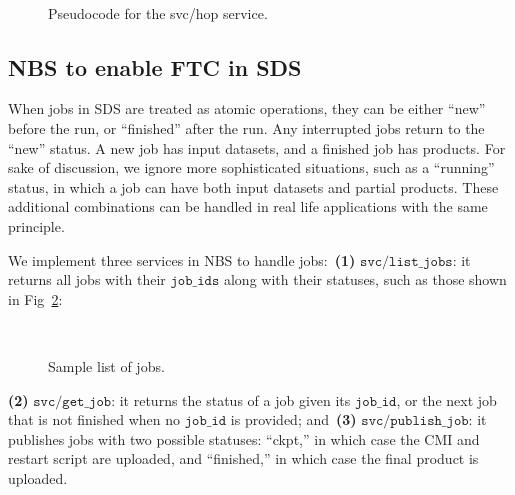 \documentclass[conference]{IEEEtran}
\begin{document}
\begin{figure}[!ht]
\vspace{0.1in}
\begin{center}
\begin{center}
\mbox{}\\[0.3em]
\end{center}
\hspace{\fill}%
\caption{Pseudocode for the svc/hop service.}
\label{code:svc_hop}
\end{center}
\end{figure}


\subsection{NBS to enable FTC in SDS}
\label{subsec:s23}

When jobs in SDS are treated as atomic operations, they can be either ``new'' before the run, or ``finished'' after the run. Any interrupted jobs return to the ``new'' status. A new job has input datasets, and a finished job has products. For sake of discussion, we ignore more sophisticated situations, such as a ``running'' status, in which a job can have both input datasets and partial products. These additional combinations can be handled in real life applications with the same principle.

We implement three services in NBS to handle jobs:~\textbf{(1)} $\mathtt{svc/list\_jobs}$: it returns all jobs with their $\mathtt{job\_ids}$ along with their statuses, such as those shown in Fig~\ref{code:jobs}:

\begin{figure}[!ht]
\vspace{0.1in}
\begin{center}
\begin{center}
\mbox{}\\[0.3em]
\end{center}
\hspace{\fill}%
\caption{Sample list of jobs.}
\label{code:jobs}
\end{center}
\end{figure}

\textbf{(2)} $\mathtt{svc/get\_job}$: it returns the status of a job given its $\mathtt{job\_id}$, or the next job that is not finished when no $\mathtt{job\_id}$ is provided; and~\textbf{(3)} $\mathtt{svc/publish\_job}$: it publishes jobs with two possible statuses: ``ckpt,'' in which case the CMI and restart script are uploaded, and ``finished,'' in which case the final product is uploaded.
\end{document}
